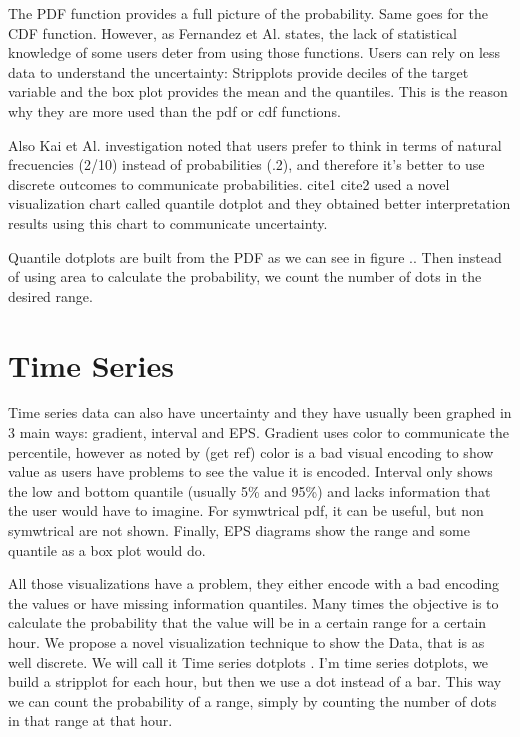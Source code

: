 \documentclass[a4paper,3p,sort&compress]{elsarticle}
\begin{document}
The PDF function provides a full picture of the probability. Same goes for the CDF function. However, as Fernandez et Al. states, the lack of statistical knowledge of some users deter from using those functions.  
Users can rely on less data to understand the uncertainty: Stripplots provide deciles of the target variable and the box plot provides the mean and the quantiles. This is the reason why they are more used than the pdf or cdf functions.

Also Kai et Al. investigation noted that users prefer to think in terms of natural frecuencies (2/10) instead of probabilities (.2), and therefore it's better to use discrete outcomes to communicate probabilities. cite1 cite2 used a novel visualization chart called quantile dotplot and they obtained better interpretation results using this chart to communicate uncertainty.

Quantile dotplots are built from the PDF as we can see in figure .. Then instead of using area to calculate the probability, we count the number of dots in the desired range.

\section{Time Series}
\label{sec:time_series}

Time series data can also have uncertainty and they have usually been graphed in 3 main ways: gradient, interval and EPS.
Gradient uses color to communicate the percentile, however as noted by (get ref) color is a bad visual encoding to show value as users have problems to see the value it is encoded.
Interval only shows the low and bottom quantile (usually 5\% and 95\%) and lacks information that the user would have to imagine. For symwtrical pdf, it can be useful, but non symwtrical are not shown.
Finally, EPS diagrams show the range and some quantile as a box plot would do.

All those visualizations have a problem, they either encode with a bad encoding the values or have missing information quantiles. 
Many times the objective is to calculate the probability that the value will be in a certain range for a certain hour.
We propose a novel visualization technique to show the Data, that is as well discrete. We will call it Time series dotplots . I'm time series dotplots, we build a stripplot for each hour, but then we use a dot instead of a bar. This way we can count the probability of a range, simply by counting the number of dots in that range at that hour.
\end{document}

